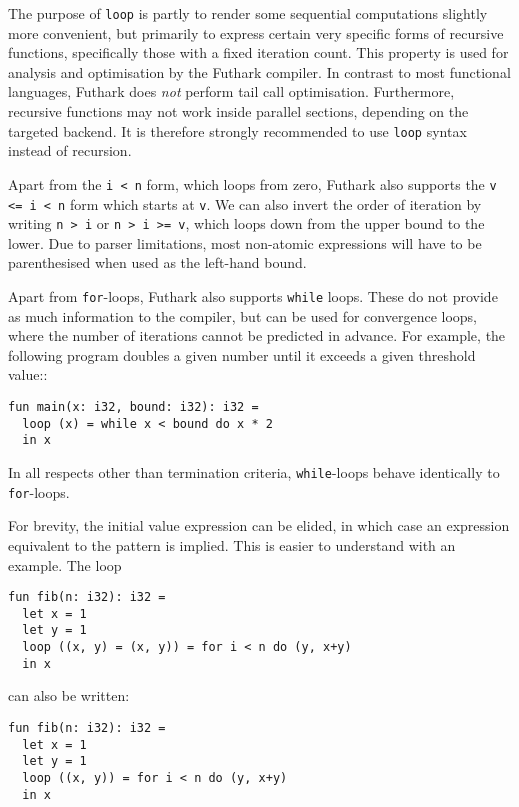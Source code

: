 \documentclass[oneside,11pt]{book}
\begin{document}
The purpose of \texttt{loop} is partly to render some sequential
computations slightly more convenient, but primarily to express
certain very specific forms of recursive functions, specifically those
with a fixed iteration count.  This property is used for analysis and
optimisation by the Futhark compiler.  In contrast to most functional
languages, Futhark does \textit{not} perform tail call optimisation.
Furthermore, recursive functions may not work inside parallel
sections, depending on the targeted backend.  It is therefore strongly
recommended to use \texttt{loop} syntax instead of recursion.

Apart from the \texttt{i < n} form, which loops from zero, Futhark
also supports the \texttt{v <= i < n} form which starts at \texttt{v}.
We can also invert the order of iteration by writing \texttt{n > i} or
\texttt{n > i >= v}, which loops down from the upper bound to the
lower.  Due to parser limitations, most non-atomic expressions will
have to be parenthesised when used as the left-hand bound.

Apart from \texttt{for}-loops, Futhark also supports \texttt{while}
loops.  These do not provide as much information to the compiler, but
can be used for convergence loops, where the number of iterations
cannot be predicted in advance.  For example, the following program
doubles a given number until it exceeds a given threshold value::

\begin{lstlisting}
fun main(x: i32, bound: i32): i32 =
  loop (x) = while x < bound do x * 2
  in x
\end{lstlisting}

\noindent
In all respects other than termination criteria, \texttt{while}-loops
behave identically to \texttt{for}-loops.

For brevity, the initial value expression can be elided, in which case
an expression equivalent to the pattern is implied.  This is easier to
understand with an example.  The loop

\begin{lstlisting}
fun fib(n: i32): i32 =
  let x = 1
  let y = 1
  loop ((x, y) = (x, y)) = for i < n do (y, x+y)
  in x
\end{lstlisting}

\noindent
can also be written:

\begin{lstlisting}
fun fib(n: i32): i32 =
  let x = 1
  let y = 1
  loop ((x, y)) = for i < n do (y, x+y)
  in x
\end{lstlisting}
\end{document}
